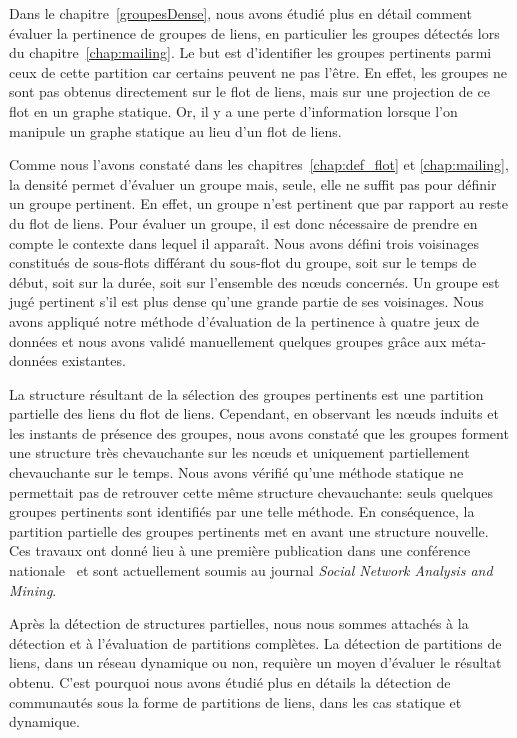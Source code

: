 \bigskip

Dans le chapitre~\ref{groupesDense}, nous avons étudié plus en détail comment évaluer la pertinence de groupes de liens, en particulier les groupes détectés lors du chapitre~\ref{chap:mailing}.
Le but est d'identifier les groupes pertinents parmi ceux de cette partition car certains peuvent ne pas l'être.
En effet, les groupes ne sont pas obtenus directement sur le flot de liens, mais sur une projection de ce flot en un graphe statique.
Or, il y a une perte d'information lorsque l'on manipule un graphe statique au lieu d'un flot de liens.

Comme nous l'avons constaté dans les chapitres~\ref{chap:def_flot} et \ref{chap:mailing}, la densité permet d'évaluer un groupe mais, seule, elle ne suffit pas pour définir un groupe pertinent.
En effet, un groupe n'est pertinent que par rapport au reste du flot de liens.
Pour évaluer un groupe, il est donc nécessaire de prendre en compte le contexte dans lequel il apparaît.
Nous avons défini trois voisinages constitués de sous-flots différant du sous-flot du groupe, soit sur le temps de début, soit sur la durée, soit sur l'ensemble des n\oe{}uds concernés.
Un groupe est jugé pertinent s'il est plus dense qu'une grande partie de ses voisinages.
Nous avons appliqué notre méthode d'évaluation de la pertinence à quatre jeux de données et nous avons validé manuellement quelques groupes grâce aux méta-données existantes.

\bigskip

La structure résultant de la sélection des groupes pertinents est une partition partielle des liens du flot de liens.
Cependant, en observant les n\oe{}uds induits et les instants de présence des groupes, nous avons constaté que les groupes forment une structure très chevauchante sur les n\oe{}uds et uniquement partiellement chevauchante sur le temps.
Nous avons vérifié qu'une méthode statique ne permettait pas de retrouver cette même structure chevauchante: seuls quelques groupes pertinents sont identifiés par une telle méthode.
En conséquence, la partition partielle des groupes pertinents met en avant une structure nouvelle.
Ces travaux ont donné lieu à une première publication dans une conférence nationale~\cite{gaumont:hal-01305118} et sont actuellement soumis au journal \emph{Social Network Analysis and Mining}.


\bigskip

Après la détection de structures partielles, nous nous sommes attachés à la détection et à l'évaluation de partitions complètes.
La détection de partitions de liens, dans un réseau dynamique ou non, requière un moyen d'évaluer le résultat obtenu.
C'est pourquoi nous avons étudié plus en détails la détection de communautés sous la forme de partitions de liens, dans les cas statique et dynamique.

